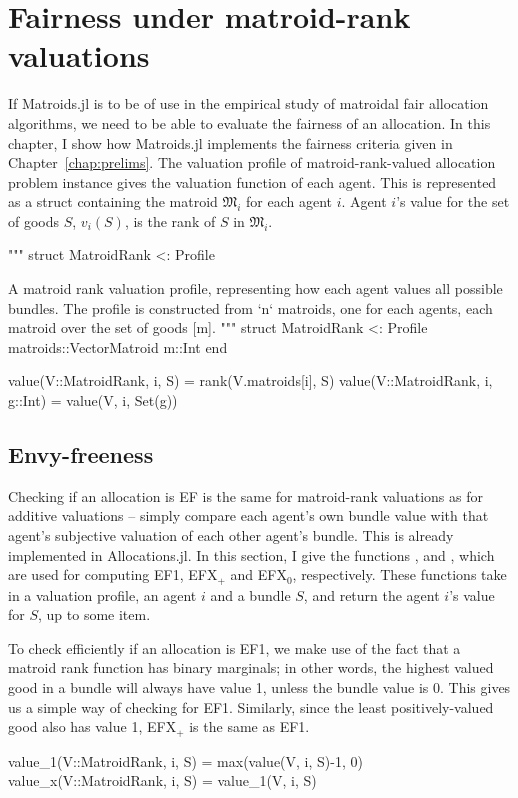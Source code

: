 \section{Fairness under matroid-rank valuations}
If Matroids.jl is to be of use in the empirical study of matroidal fair allocation algorithms, we need to be able to evaluate the fairness of an allocation. In this chapter, I show how Matroids.jl implements the fairness criteria given in Chapter~\ref{chap:prelims}. The valuation profile of matroid-rank-valued allocation problem instance gives the valuation function of each agent. This is represented as a struct containing the matroid $\mathfrak{M}_i$ for each agent $i$. Agent $i$'s value for the set of goods $S$, $v_i(S)$, is the rank of $S$ in $\mathfrak{M}_i$.
\begin{jllisting}
"""
    struct MatroidRank <: Profile

A matroid rank valuation profile, representing how each agent values all possible bundles. The profile is constructed from `n` matroids, one for each agents, each matroid over the set of goods [m]. 
"""
struct MatroidRank <: Profile
    matroids::Vector{Matroid}
    m::Int
end

value(V::MatroidRank, i, S) = rank(V.matroids[i], S)
value(V::MatroidRank, i, g::Int) = value(V, i, Set(g))
\end{jllisting}

\subsection*{Envy-freeness}
Checking if an allocation is EF is the same for matroid-rank valuations as for additive valuations -- simply compare each agent's own bundle value with that agent's subjective valuation of each other agent's bundle. This is already implemented in Allocations.jl. In this section, I give the functions ,  and , which are used for computing EF1, EFX$_+$ and EFX$_0$, respectively. These functions take in a valuation profile, an agent $i$ and a bundle $S$, and return the agent $i$'s value for $S$, up to some item. 

To check efficiently if an allocation is EF1, we make use of the fact that a matroid rank function has binary marginals; in other words, the highest valued good in a bundle will always have value 1, unless the bundle value is 0. This gives us a simple way of checking for EF1. Similarly, since the least positively-valued good also has value 1, EFX$_+$ is the same as EF1. 
\begin{jllisting}
value_1(V::MatroidRank, i, S) = max(value(V, i, S)-1, 0)
value_x(V::MatroidRank, i, S) = value_1(V, i, S)
\end{jllisting}

